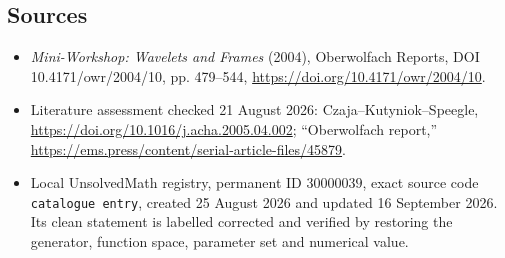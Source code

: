 \documentclass[11pt]{article}
\begin{document}
\subsection{Sources}
\begin{itemize}
\item \emph{Mini-Workshop: Wavelets and Frames} (2004), Oberwolfach Reports, DOI 10.4171/owr/2004/10, pp. 479--544, \url{https://doi.org/10.4171/owr/2004/10}.
\item Literature assessment checked 21 August 2026: Czaja--Kutyniok--Speegle, \url{https://doi.org/10.1016/j.acha.2005.04.002}; ``Oberwolfach report,'' \url{https://ems.press/content/serial-article-files/45879}.
\item Local UnsolvedMath registry, permanent ID $30000039$, exact source code \texttt{catalogue entry}, created 25 August 2026 and updated 16 September 2026. Its clean statement is labelled corrected and verified by restoring the generator, function space, parameter set and numerical value.
\end{itemize}
\end{document}
